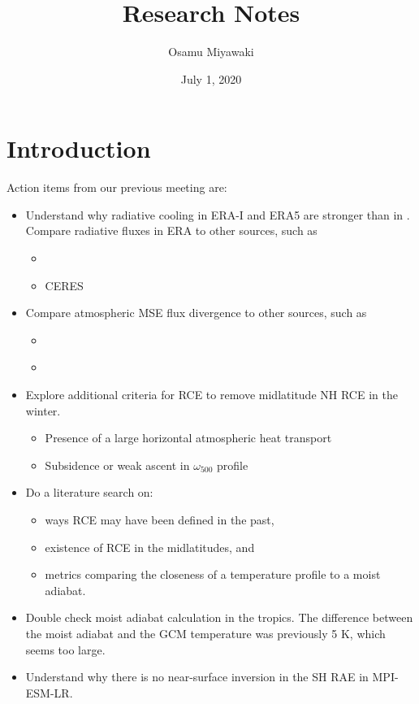 \documentclass[11pt]{article}
\author{Osamu Miyawaki}
\date{July 1, 2020}
\title{Research Notes}
\begin{document}
\maketitle

\section{Introduction}
\label{sec:org223d7eb}
Action items from our previous meeting are:
\begin{itemize}
\item Understand why radiative cooling in ERA-I and ERA5 are stronger than in \cite{hartmann_global_2016}. Compare radiative fluxes in ERA to other sources, such as
\begin{itemize}
\item \cite{donohoe_seasonal_2013}
\item CERES
\end{itemize}
\item Compare atmospheric MSE flux divergence to other sources, such as
\begin{itemize}
\item \cite{trenberth_atmospheric_2001}
\item \cite{randall_atmosphere_2012}
\end{itemize}
\item Explore additional criteria for RCE to remove midlatitude NH RCE in the winter.
\begin{itemize}
\item Presence of a large horizontal atmospheric heat transport
\item Subsidence or weak ascent in \(\omega_{500}\) profile
\end{itemize}
\item Do a literature search on:
\begin{itemize}
\item ways RCE may have been defined in the past,
\item existence of RCE in the midlatitudes, and
\item metrics comparing the closeness of a temperature profile to a moist adiabat.
\end{itemize}
\item Double check moist adiabat calculation in the tropics. The difference between the moist adiabat and the GCM temperature was previously 5 K, which seems too large.
\item Understand why there is no near-surface inversion in the SH RAE in MPI-ESM-LR.
\end{itemize}
\end{document}
